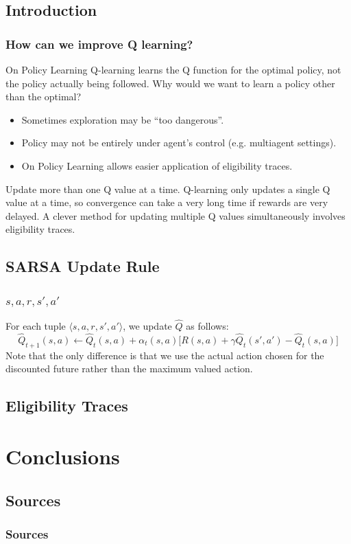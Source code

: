 \documentclass[ignorenonframetext]{beamer}
\begin{document}
\subsection{Introduction}
\begin{frame}[allowframebreaks]
	\frametitle{How can we improve Q learning?}
	\begin{block}{On Policy Learning}
		Q-learning learns the Q function for the optimal policy, not the
		policy actually being followed.  Why would we want to learn a
		policy other than the optimal?
		\begin{itemize}
			\item Sometimes exploration may be ``too dangerous''.
			\item Policy may not be entirely under agent's control (e.g.
				multiagent settings).
			\item On Policy Learning allows easier application of
				eligibility traces.
		\end{itemize}
	\end{block}
	\begin{block}{Update more than one Q value at a time.}
		Q-learning only updates a single Q value at a time, so convergence
		can take a very long time if rewards are very delayed.  A clever
		method for updating multiple Q values simultaneously involves
		eligibility traces.
	\end{block}
\end{frame}

\subsection{SARSA Update Rule}
\begin{frame}
	\frametitle{$s,a,r,s',a'$}
	For each tuple $\langle s,a,r,s',a' \rangle$, we update $\hat{Q}$
	as follows:
	\[
	\hat{Q}_{t+1}(s,a) \leftarrow \hat{Q}_t(s,a) + \alpha_t(s,a)\big[ R(s,a) + \gamma 
	\hat{Q}_t(s',a') - \hat{Q}_t(s,a) \big]
	\]
	Note that the only difference is that we use the actual action
	chosen for the discounted future rather than the maximum valued
	action.
\end{frame}

\subsection{Eligibility Traces}
\begin{frame}
\end{frame}

\section{Conclusions}

\subsection{Sources}
\begin{frame}[allowframebreaks]
	\frametitle{Sources}
	\nocite{*}
	
	
\end{frame}
\end{document}
